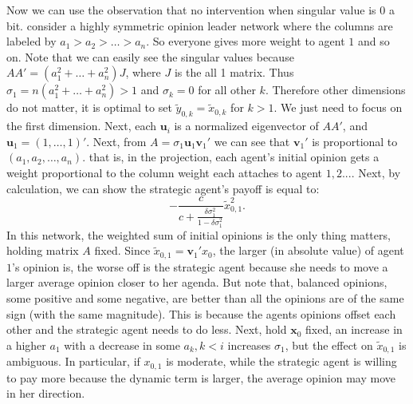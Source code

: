 \documentclass{article}
\newcommand{\x}{\mathbf{x}}
\newcommand{\ve}{\mathbf{v}}
\newcommand{\ue}{\mathbf{u}}
\begin{document}
Now we can use the observation that no intervention when singular value is $0$ a bit. consider a highly symmetric opinion leader network where the columns are labeled by $a_1>a_2>\ldots>a_n$. So everyone gives more weight to agent $1$ and so on. Note that we can easily see the singular values because $AA'=(a_1^2+\ldots+a_n^2)J$, where $J$ is the all 1 matrix. Thus $\sigma_1=n(a_1^2+\ldots+a_n^2)>1$ and $\sigma_k=0$ for all other $k$. Therefore other dimensions do not matter, it is optimal to set $\tilde y_{0,k}=\tilde x_{0,k}$ for $k>1$. We just need to focus on the first dimension. 
Next, each $\ue_i$ is a normalized eigenvector of $AA'$, and $\ue_1=(1,\ldots,1)'$. Next, from $A=\sigma_1\ue_1\ve_1'$ we can see that $\ve_1'$ is proportional to $(a_1,a_2,\ldots,a_n)$. that is, in the projection, each agent's initial opinion gets a weight proportional to the column weight each attaches to agent $1,2...$. Next, by calculation, we can show the strategic agent's payoff is equal to:
$$-\frac{c}{c+\frac{\delta \sigma_1^2}{1-\delta \sigma_1^2}}\tilde x_{0,1}^2.$$ In this network, the weighted sum of initial opinions is the only thing matters, holding matrix $A$ fixed. Since $\tilde x_{0,1}=\ve_1'x_0$, the larger (in absolute value) of agent $1$'s opinion is, the worse off is the strategic agent because she needs to move a larger average opinion closer to her agenda. But note that, balanced opinions, some positive and some negative, are better than all the opinions are of the same sign (with the same magnitude). This is because the agents opinions offset each other and the strategic agent needs to do less. Next, hold $\x_0$ fixed, an increase in a higher $a_1$ with a decrease in some $a_k,k<i$ increases $\sigma_1$, but the effect on $\tilde x_{0,1}$ is ambiguous. In particular, if $x_{0,1}$ is moderate, while the strategic agent is willing to pay more because the dynamic term is larger, the average opinion may move in her direction.

\end{document}
